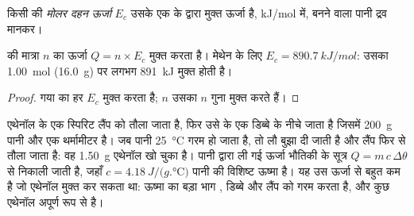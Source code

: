 \begin{definition}[मोलर दहन ऊर्जा]\label{def:g11:reaction-energy:combustion-energy}
किसी  की \emph{मोलर दहन ऊर्जा}
$E_c$ उसके एक  के  द्वारा मुक्त ऊर्जा है,
\si{kJ/mol} में, बनने वाला पानी द्रव मानकर।
\end{definition}

\begin{proposition}[$n$ मोल द्वारा मुक्त ऊर्जा]\label{prop:g11:reaction-energy:n-moles}
 की मात्रा $n$ का  ऊर्जा
$Q = n \times E_c$ मुक्त करता है। मेथेन के लिए $E_c = \qty{890.7}{kJ/mol}$: उसका
\qty{1.00}{mol} (\qty{16.0}{g})  पर लगभग \qty{891}{kJ} मुक्त होती है।
\end{proposition}

\begin{proof}
 गया  का हर  $E_c$ मुक्त करता है; $n$  उसका $n$ गुना
मुक्त करते हैं।
\end{proof}

\begin{inthelab}
एथेनॉल के एक स्पिरिट लैंप को तौला जाता है, फिर उसे  के एक डिब्बे के नीचे
 जाता है जिसमें \qty{200}{g} पानी और एक थर्मामीटर है। जब पानी
\qty{25}{\celsius} गरम हो जाता है, तो लौ बुझा दी जाती है और लैंप
फिर से तौला जाता है: वह \qty{1.50}{g} एथेनॉल खो चुका है। पानी द्वारा ली गई ऊर्जा
भौतिकी के सूत्र $Q = m\, c\, \Delta\theta$ से निकाली जाती है,
जहाँ $c = \qty{4.18}{J/(g.\celsius)}$ पानी की विशिष्ट ऊष्मा है। यह
उस ऊर्जा से बहुत कम है जो एथेनॉल मुक्त कर सकता था: ऊष्मा का बड़ा भाग
, डिब्बे और लैंप को गरम करता है, और कुछ एथेनॉल अपूर्ण रूप से
 है।
\end{inthelab}

